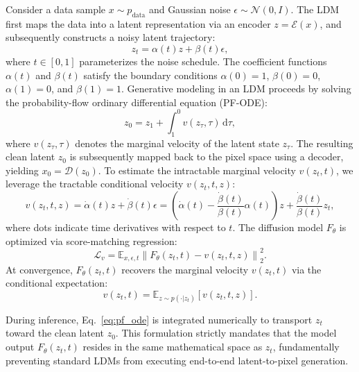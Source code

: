 Consider a data sample $x \sim p_{\text{data}}$ and Gaussian noise $\epsilon \sim \mathcal{N}(0, I)$. The LDM first maps the data into a latent representation via an encoder $z = \mathcal{E}(x)$, and subsequently constructs a noisy latent trajectory:
\begin{equation}
z_t = \alpha(t) z + \beta(t) \epsilon,
\label{eq:ldm_forward}
\end{equation}
where $t \in [0, 1]$ parameterizes the noise schedule. The coefficient functions $\alpha(t)$ and $\beta(t)$ satisfy the boundary conditions $\alpha(0) = 1$, $\beta(0) = 0$, $\alpha(1) = 0$, and $\beta(1) = 1$. Generative modeling in an LDM proceeds by solving the probability-flow ordinary differential equation (PF-ODE):
\begin{equation}
z_0 = z_1 + \int_{1}^{0} v(z_\tau, \tau)\,\mathrm{d}\tau,
\label{eq:pf_ode}
\end{equation}
where $v(z_{\tau}, \tau)$ denotes the marginal velocity of the latent state $z_{\tau}$. The resulting clean latent $z_0$ is subsequently mapped back to the pixel space using a decoder, yielding $x_0 = \mathcal{D}(z_0)$. To estimate the intractable marginal velocity $v(z_t, t)$, we leverage the tractable conditional velocity $v(z_t, t, z)$:
\begin{equation}
v(z_t, t, z) = \dot{\alpha}(t)z + \dot{\beta}(t)\epsilon = \left(\dot{\alpha}(t)-\frac{\dot{\beta}(t)}{\beta(t)}\alpha(t)\right)z + \frac{\dot{\beta}(t)}{\beta(t)}z_t,
\label{eq:conditional_velocity}
\end{equation}
where dots indicate time derivatives with respect to $t$. The diffusion model $F_\theta$ is optimized via score-matching regression:
\begin{equation}
\mathcal{L}_{v} = \mathbb{E}_{x,\epsilon,t} \left\| F_\theta(z_t, t) - v(z_t, t, z) \right\|_2^2.
\end{equation}
At convergence, $F_{\theta}(z_t,t)$ recovers the marginal velocity $v(z_t,t)$ via the conditional expectation:
\begin{equation}
v(z_t, t) = \mathbb{E}_{z\sim p(\cdot|z_t)}\left[v(z_t, t, z)\right].
\label{eq:marginal_velocity}
\end{equation}

During inference, Eq.~\eqref{eq:pf_ode} is integrated numerically to transport $z_t$ toward the clean latent $z_0$. This formulation strictly mandates that the model output $F_\theta(z_t, t)$ resides in the same mathematical space as $z_t$, fundamentally preventing standard LDMs from executing end-to-end latent-to-pixel generation.

